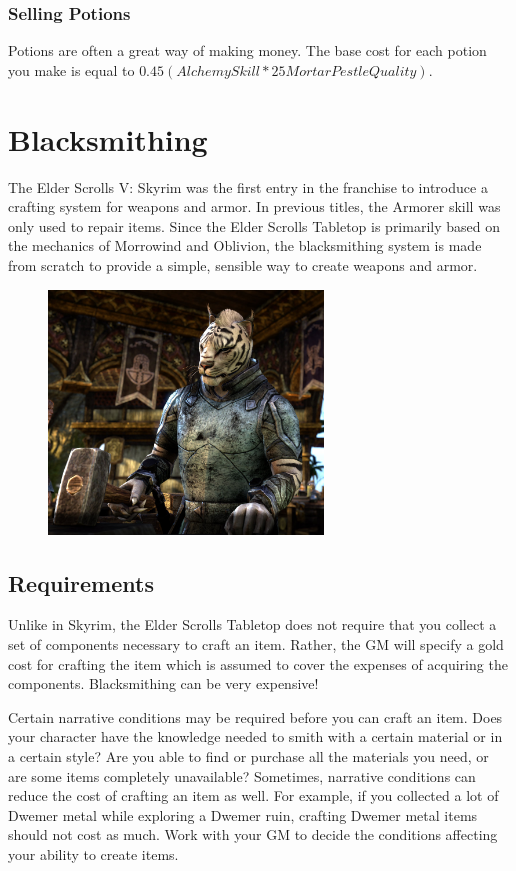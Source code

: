 \documentclass[12pt]{book}
\begin{document}
\subsubsection{Selling Potions}
Potions are often a great way of making money. The base cost for each potion you make is equal to $0.45(Alchemy Skill*25MortarPestleQuality)$.

\section{Blacksmithing}

The Elder Scrolls V: Skyrim was the first entry in the franchise to introduce a crafting system for weapons and armor. In previous titles, the Armorer skill was only used to repair items. Since the Elder Scrolls Tabletop is primarily based on the mechanics of Morrowind and Oblivion, the blacksmithing system is made from scratch to provide a simple, sensible way to create weapons and armor.

\begin{figure}[H]
	\includegraphics[width=0.65\textwidth]{blacksmith.png}
\end{figure}

\subsection{Requirements}
Unlike in Skyrim, the Elder Scrolls Tabletop does not require that you collect a set of components necessary to craft an item. Rather, the GM will specify a gold cost for crafting the item which is assumed to cover the expenses of acquiring the components. Blacksmithing can be very expensive!

Certain narrative conditions may be required before you can craft an item. Does your character have the knowledge needed to smith with a certain material or in a certain style? Are you able to find or purchase all the materials you need, or are some items completely unavailable? Sometimes, narrative conditions can reduce the cost of crafting an item as well. For example, if you collected a lot of Dwemer metal while exploring a Dwemer ruin, crafting Dwemer metal items should not cost as much. Work with your GM to decide the conditions affecting your ability to create items.
\end{document}
